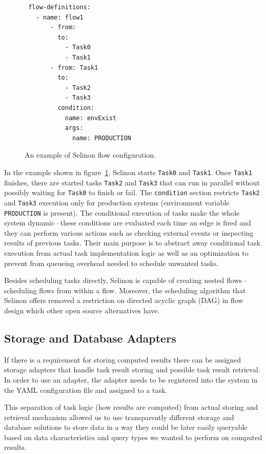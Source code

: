 \documentclass[a4paper]{llncs}
\begin{document}
\begin{figure}[h!]
\begin{verbatim}
 flow-definitions:
   - name: flow1
       - from:
         to:
           - Task0
           - Task1
       - from: Task1
         to:
           - Task2
           - Task3
         condition:
           name: envExist
           args:
             name: PRODUCTION
\end{verbatim}
  \caption{An example of Selinon flow configuration.}
  \label{conf_flow}
\end{figure}

In the example shown in figure~\ref{conf_flow}, Selinon starts \texttt{Task0} and \texttt{Task1}. Once \texttt{Task1} finishes, there are started tasks \texttt{Task2} and \texttt{Task3} that can run in parallel without possibly waiting for \texttt{Task0} to finish or fail. The \texttt{condition} section restricts \texttt{Task2} and \texttt{Task3} execution only for production systems (environment variable \texttt{PRODUCTION} is present). The conditional execution of tasks make the whole system dynamic\,--\,these conditions are evaluated each time an edge is fired and they can perform various actions such as checking external events or inspecting results of previous tasks. Their main purpose is to abstract away conditional task execution from actual task implementation logic as well as an optimization to prevent from queueing overhead needed to schedule unwanted tasks.

Besides scheduling tasks directly, Selinon is capable of creating nested flows\,--\,scheduling flows from within a flow. Moreover, the scheduling algorithm that Selinon offers removed a restriction on directed acyclic graph (DAG) in flow design which other open source alternatives have.

\subsection{Storage and Database Adapters} \label{subsection_storage}

If there is a requirement for storing computed results there can be assigned storage adapters that handle task result storing and possible task result retrieval. In order to use an adapter, the adapter needs to be registered into the system in the YAML configuration file and assigned to a task.

This separation of task logic (how results are computed) from actual storing and retrieval mechanism allowed us to use transparently different storage and database solutions to store data in a way they could be later easily queryable based on data characteristics and query types we wanted to perform on computed results.
\end{document}
